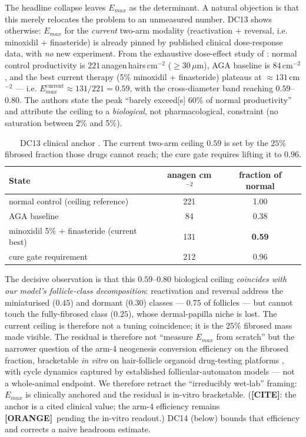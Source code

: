 \documentclass[11pt,a4paper]{article}
\newcommand{\tierbadge}[2]{\textcolor{#1}{\textbf{[#2]}}}
\providecommand{\tierYellow}{\tierbadge{yellow!50!black}{CITE}}
\providecommand{\tierOrange}{\tierbadge{orange!80!black}{ORANGE}}
\begin{document}
The headline collapse leaves $E_{max}$ as the determinant. A natural objection is
that this merely relocates the problem to an unmeasured number. DC13 shows
otherwise: $E_{max}$ for the \emph{current} two-arm modality (reactivation $+$
reversal, i.e. minoxidil $+$ finasteride) is already pinned by published clinical
dose-response data, with \emph{no} new experiment. From the exhaustive
dose-effect study of \citet{vanneste2020}: normal control productivity is
$221$\,anagen\,hairs\,cm$^{-2}$ ($\geq 30\,\mu$m), AGA baseline is
$84$\,cm$^{-2}$, and the best current therapy (5\% minoxidil $+$ finasteride)
plateaus at $\approx 131$\,cm$^{-2}$ --- i.e. $E_{max}^{\text{current}}\approx
131/221 = 0.59$, with the cross-diameter band reaching $0.59$--$0.80$. The authors
state the peak ``barely exceed[s] 60\% of normal productivity'' and attribute the
ceiling to a \emph{biological}, not pharmacological, constraint (no saturation
between 2\% and 5\%).

\begin{table}[h]
\centering\small
\begin{tabular}{lcc}
\toprule
\textbf{State} & \textbf{anagen cm$^{-2}$} & \textbf{fraction of normal} \\
\midrule
normal control (ceiling reference) & 221 & 1.00 \\
AGA baseline                       &  84 & 0.38 \\
minoxidil 5\% $+$ finasteride (current best) & 131 & \textbf{0.59} \\
\midrule
cure gate requirement              & 212 & 0.96 \\
\bottomrule
\end{tabular}
\caption{DC13 clinical anchor \citep{vanneste2020}. The current two-arm ceiling
$0.59$ is set by the $25\%$ fibrosed fraction those drugs cannot reach; the cure
gate requires lifting it to $0.96$.}
\label{tab:dc13}
\end{table}

\noindent The decisive observation is that this $0.59$--$0.80$ biological ceiling
\emph{coincides with our model's follicle-class decomposition}: reactivation and
reversal address the miniaturised ($0.45$) and dormant ($0.30$) classes ---
$0.75$ of follicles --- but cannot touch the fully-fibrosed class ($0.25$), whose
dermal-papilla niche is lost. The current ceiling is therefore not a tuning
coincidence; it is the $25\%$ fibrosed mass made visible. The residual is
therefore not ``measure $E_{max}$ from scratch'' but the narrower question of the
arm-4 neogenesis conversion efficiency on the fibrosed fraction, bracketable
\emph{in vitro} on hair-follicle organoid drug-testing platforms
\citep{vitroDrugTest2023}, with cycle dynamics captured by established
follicular-automaton models \citep{halloy2000} --- not a whole-animal endpoint.
We therefore retract the ``irreducibly wet-lab'' framing: $E_{max}$ is clinically
anchored and the residual is in-vitro bracketable. (\tierYellow: the anchor is a
cited clinical value; the arm-4 efficiency remains \tierOrange\ pending the
in-vitro readout.) DC14 (below) bounds that efficiency and corrects a naive
headroom estimate.
\end{document}
